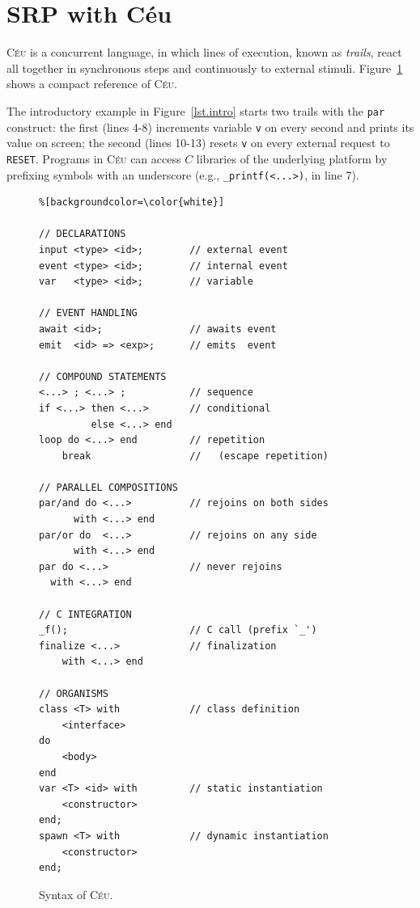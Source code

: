 \documentclass{acm_proc_article-sp}
\newcommand{\CEU}{\textsc{C\'{e}u}\xspace}
\newcommand{\code}[1] {{\small{\texttt{#1}}}}
\newcommand{\1}{\;}
\newcommand{\2}{\;\;}
\newcommand{\3}{\;\;\;}
\newcommand{\5}{\;\;\;\;\;}
\begin{document}
\section{SRP with C\'eu}
\label{sec.ceu}

\CEU is a concurrent language, in which lines of execution, known as 
\emph{trails}, react all together in synchronous steps and continuously to 
external stimuli.
%
Figure~\ref{lst.syntax} shows a compact reference of \CEU.

The introductory example in Figure~\ref{lst.intro} starts two trails with the 
\code{par} construct: the first (lines 4-8) increments variable \code{v} on 
every second and prints its value on screen; the second (lines 10-13) resets 
\code{v} on every external request to \code{RESET}.
%
%
Programs in \CEU can access $C$ libraries of the underlying platform by 
prefixing symbols with an underscore (e.g., \code{\_printf(<...>)}, in line 7).

\begin{figure}[t]
\begin{lstlisting}%[backgroundcolor=\color{white}]

// DECLARATIONS
input <type> <id>;        // external event
event <type> <id>;        // internal event
var   <type> <id>;        // variable

// EVENT HANDLING
await <id>;               // awaits event
emit  <id> => <exp>;      // emits  event

// COMPOUND STATEMENTS
<...> ; <...> ;           // sequence
if <...> then <...>       // conditional
         else <...> end
loop do <...> end         // repetition
    break                 //   (escape repetition)

// PARALLEL COMPOSITIONS
par/and do <...>          // rejoins on both sides
      with <...> end
par/or do  <...>          // rejoins on any side
      with <...> end
par do <...>              // never rejoins
  with <...> end

// C INTEGRATION
_f();                     // C call (prefix `_')
finalize <...>            // finalization
    with <...> end

// ORGANISMS
class <T> with            // class definition
    <interface>
do
    <body>
end
var <T> <id> with         // static instantiation
    <constructor>
end;
spawn <T> with            // dynamic instantiation
    <constructor>
end;
\end{lstlisting}
\caption{ Syntax of \CEU.
\label{lst.syntax}
}
\end{figure}
\end{document}
